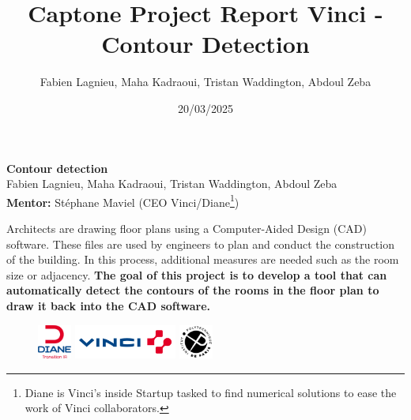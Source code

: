 \documentclass[11pt]{article}
\title{Captone Project Report Vinci - Contour Detection}
\author{Fabien Lagnieu, Maha Kadraoui, Tristan Waddington, Abdoul Zeba}
\date{20/03/2025}
\begin{document}
\begin{center}
\textbf{Contour detection} \\
Fabien Lagnieu, Maha Kadraoui, Tristan Waddington, Abdoul Zeba\\
\textbf{Mentor:} Stéphane Maviel (CEO Vinci/Diane\footnote{Diane is Vinci's inside Startup tasked to find numerical solutions
to ease the work of Vinci collaborators.}) \\\vspace{2em}
\textbf{\Large }
\end{center}
\vspace{-1cm}

Architects are drawing floor plans using a Computer-Aided Design (CAD) software. These files are used
by engineers to plan and conduct the construction of the building. In this process,
additional measures are needed such as the room size or adjacency. \textbf{The goal of 
this project is to develop a tool that can automatically detect the contours of 
the rooms in the floor plan to draw it back into the CAD software.}

\begin{figure}[h]
    \centering
    \includegraphics[width=0.1\textwidth]{figures/Diane.png}
    \hspace{0.1\textwidth}
    \includegraphics[width=0.3\textwidth]{figures/logo_vinci.png}
    \hspace{0.1\textwidth}
    \includegraphics[width=0.1\textwidth]{figures/ipparis.png}

    \label{fig:my_label}
\end{figure}
\end{document}
